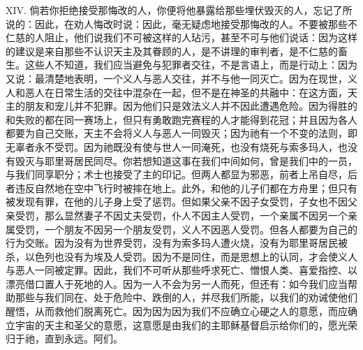 XIV. 倘若你拒绝接受那悔改的人，你便将他暴露给那些埋伏毁灭的人，忘记了所说的：因此，在劝人悔改时说：因此，毫无疑虑地接受那悔改的人。不要被那些不仁慈的人阻止，他们说我们不可被这样的人玷污，甚至不可与他们说话：因为这样的建议是来自那些不认识天主及其眷顾的人，是不讲理的审判者，是不仁慈的畜生。这些人不知道，我们应当避免与犯罪者交往，不是言语上，而是行动上：因为又说：最清楚地表明，一个义人与恶人交往，并不与他一同灭亡。因为在现世，义人和恶人在日常生活的交往中混杂在一起，但不是在神圣的共融中：在这方面，天主的朋友和宠儿并不犯罪。因为他们只是效法义人并不因此遭遇危险。因为得胜的和失败的都在同一赛场上，但只有勇敢跑完赛程的人才能得到花冠；并且因为各人都要为自己交账，天主不会将义人与恶人一同毁灭；因为祂有一个不变的法则，即无辜者永不受罚。因为祂既没有使与世人一同淹死，也没有烧死与索多玛人，也没有毁灭与耶里哥居民同尽。你若想知道这事在我们中间如何，曾是我们中的一员，与我们同享职分；术士也接受了主的印记。但两人都显为邪恶，前者上吊自尽，后者违反自然地在空中飞行时被摔在地上。此外，和他的儿子们都在方舟里；但只有被发现有罪，在他的儿子身上受了惩罚。但如果父亲不因子女受罚，子女也不因父亲受罚，那么显然妻子不因丈夫受罚，仆人不因主人受罚，一个亲属不因另一个亲属受罚，一个朋友不因另一个朋友受罚，义人不因恶人受罚。但各人都要为自己的行为交账。因为没有为世界受罚，没有为索多玛人遭火烧，没有为耶里哥居民被杀，以色列也没有为埃及人受罚。因为不是同住，而是思想上的认同，才会使义人与恶人一同被定罪。因此，我们不可听从那些呼求死亡、憎恨人类、喜爱指控、以漂亮借口置人于死地的人。因为一人不会为另一人而死，但还有：如今我们应当帮助那些与我们同在、处于危险中、跌倒的人，并尽我们所能，以我们的劝诫使他们醒悟，从而救他们脱离死亡。因为因为因为我们不应确立心硬之人的意愿，而应确立宇宙的天主和圣父的意愿，这意愿是由我们的主耶稣基督启示给你们的，愿光荣归于祂，直到永远。阿们。\par

